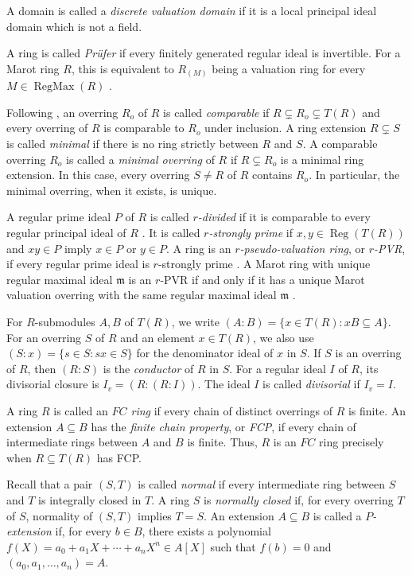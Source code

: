 \documentclass[12pt]{article}
\newcommand{\Reg}{\operatorname{Reg}}
\newcommand{\RegMax}{\operatorname{RegMax}}
\begin{document}
	A domain is called a \emph{discrete valuation domain} if it is a local principal ideal domain which is not a field.
	
	A ring is called \emph{Prüfer} if every finitely generated regular ideal is invertible. For a Marot ring $R$, this is equivalent to $R_{(M)}$ being a valuation ring for every $M\in\RegMax(R)$ \cite[Theorems 6.2 and 7.6]{huckaba}.
	
	Following \cite{marot}, an overring $R_o$ of $R$ is called \emph{comparable} if $R\subsetneq R_o\subsetneq T(R)$ and every overring of $R$ is comparable to $R_o$ under inclusion. A ring extension $R\subsetneq S$ is called \emph{minimal} if there is no ring strictly between $R$ and $S$. A comparable overring $R_o$ is called a \emph{minimal overring} of $R$ if $R\subsetneq R_o$ is a minimal ring extension. In this case, every overring $S\neq R$ of $R$ contains $R_o$. In particular, the minimal overring, when it exists, is unique.
	
	A regular prime ideal $P$ of $R$ is called \emph{$r$-divided} if it is comparable to every regular principal ideal of $R$ \cite[Definition 2.7]{marot}. It is called \emph{$r$-strongly prime} if $x,y\in\Reg(T(R))$ and $xy\in P$ imply $x\in P$ or $y\in P$. A ring is an \emph{$r$-pseudo-valuation ring}, or \emph{$r$-PVR}, if every regular prime ideal is $r$-strongly prime \cite{chang}. A Marot ring with unique regular maximal ideal $\mathfrak{m}$ is an $r$-PVR if and only if it has a unique Marot valuation overring with the same regular maximal ideal $\mathfrak{m}$ \cite[Theorem2.16]{marot}.
	
	For $R$-submodules $A,B$ of $T(R)$, we write $(A:B)=\{x\in T(R):xB\subseteq A\}.$ For an overring $S$ of $R$ and an element $x\in T(R)$, we also use $(S:x)=\{s\in S:sx\in S\}$ for the denominator ideal of $x$ in $S$. If $S$ is an overring of $R$, then $(R:S)$ is the \emph{conductor} of $R$ in $S$. For a regular ideal $I$ of $R$, its divisorial closure is $I_v=(R:(R:I))$. The ideal $I$ is called \emph{divisorial} if $I_v=I$.
	
	A ring $R$ is called an \emph{$FC$ ring} if every chain of distinct overrings of $R$ is finite. An extension $A\subseteq B$ has the \emph{finite chain property}, or \emph{FCP}, if every chain of intermediate rings between $A$ and $B$ is finite. Thus, $R$ is an $FC$ ring precisely when $R\subseteq T(R)$ has FCP. 

	Recall that a pair $(S,T)$ is called \emph{normal} if every intermediate ring between $S$ and $T$ is integrally closed in $T$. A ring $S$ is \emph{normally closed} if, for every overring $T$ of $S$, normality of $(S,T)$ implies $T=S$. An extension $A\subseteq B$ is called a \emph{$P$-extension} if, for every $b\in B$, there exists a polynomial $f(X)=a_0+a_1X+\cdots+a_nX^n\in A[X]$ such that $f(b)=0$ and $(a_0,a_1,\ldots,a_n)=A$.
	
\end{document}
